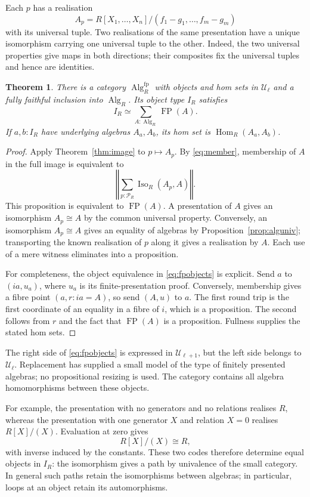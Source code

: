 \documentclass[11pt]{amsart}
\newtheorem{theorem}{Theorem}[section]
\theoremstyle{definition}
\theoremstyle{remark}
\newcommand{\UU}{\mathcal U}
\newcommand{\Hom}{\operatorname{Hom}}
\newcommand{\Iso}{\operatorname{Iso}}
\newcommand{\Alg}{\operatorname{Alg}}
\newcommand{\FP}{\operatorname{FP}}
\newcommand{\tr}[1]{\left\Vert #1\right\Vert}
\begin{document}
Each $p$ has a realisation
\[
 A_p=R[X_1,\ldots,X_n]/(f_1-g_1,\ldots,f_m-g_m)
\]
with its universal tuple. Two realisations of the same presentation have
a unique isomorphism carrying one universal tuple to the other. Indeed,
the two universal properties give maps in both directions; their
composites fix the universal tuples and hence are identities.

\begin{theorem}\label{thm:fp}
There is a category $\Alg_R^{\mathrm{fp}}$ with objects and hom sets in
$\UU_\ell$ and a fully faithful inclusion into $\Alg_R$. Its object type
$I_R$ satisfies
\begin{equation}\label{eq:fpobjects}
 I_R\simeq\sum_{A:\Alg_R}\FP(A).
\end{equation}
If $a,b:I_R$ have underlying algebras $A_a,A_b$, its hom set is
$\Hom_R(A_a,A_b)$.
\end{theorem}
\begin{proof}
Apply Theorem~\ref{thm:image} to $p\mapsto A_p$. By
\eqref{eq:member}, membership of $A$ in the full image is equivalent to
\begin{equation}\label{eq:fpmember}
 \tr{\sum_{p:\mathcal P_R}\Iso_R(A_p,A)}.
\end{equation}
This proposition is equivalent to $\FP(A)$. A presentation of $A$ gives
an isomorphism $A_p\cong A$ by the common universal property. Conversely,
an isomorphism $A_p\cong A$ gives an equality of algebras by
Proposition~\ref{prop:alguniv}; transporting the known realisation of $p$
along it gives a realisation by $A$. Each use of a mere witness eliminates
into a proposition.

For completeness, the object equivalence in \eqref{eq:fpobjects} is
explicit. Send $a$ to $(ia,u_a)$, where $u_a$ is its finite-presentation proof.
Conversely, membership gives a fibre point $(a,r:ia=A)$, so send $(A,u)$
to $a$. The first round trip is the first coordinate of an equality in
a fibre of $i$, which is a proposition. The second follows from $r$ and
the fact that $\FP(A)$ is a proposition. Fullness supplies the stated
hom sets.
\end{proof}

The right side of \eqref{eq:fpobjects} is expressed in $\UU_{\ell+1}$,
but the left side belongs to $\UU_\ell$. Replacement has supplied a
small model of the type of finitely presented algebras; no propositional
resizing is used. The category contains all algebra homomorphisms
between these objects.

For example, the presentation with no generators and no relations
realises $R$, whereas the presentation with one generator $X$ and relation
$X=0$ realises $R[X]/(X)$. Evaluation at zero gives
\[
 R[X]/(X)\cong R,
\]
with inverse induced by the constants. These two codes therefore determine
equal objects in $I_R$: the isomorphism gives a path by univalence of the
small category. In general such paths retain the isomorphisms between
algebras; in particular, loops at an object retain its automorphisms.
\end{document}
